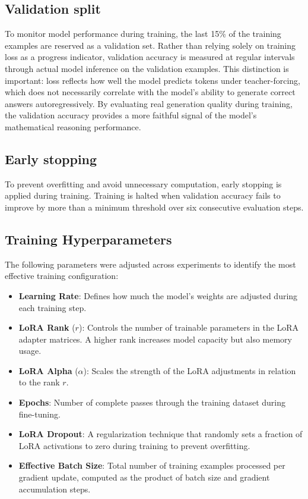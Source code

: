 \subsection*{Validation split}
To monitor model performance during training, the last 15\% of
  the training examples are reserved as a validation set.
  Rather than
  relying solely on training loss as a progress indicator,
  validation accuracy is measured at regular intervals through
  actual model inference on the validation examples. This
  distinction is important: loss reflects how well the model
  predicts tokens under teacher-forcing, which does not
  necessarily correlate with the model's ability to generate
  correct answers autoregressively. By evaluating real generation
  quality during training, the validation accuracy provides a more
  faithful signal of the model's mathematical reasoning
  performance.

\subsection*{Early stopping}
To prevent overfitting and avoid unnecessary computation, early
  stopping is applied during training. Training is halted when
  validation accuracy fails to improve by more than a minimum
  threshold over six consecutive evaluation steps.

\subsection*{Training Hyperparameters}
The following parameters were adjusted across experiments to
  identify the most effective training configuration:
\begin{itemize}
      \item \textbf{Learning Rate}: Defines how much the model's
      weights are adjusted during each training step.
      \item \textbf{LoRA Rank} ($r$): Controls the number of
      trainable parameters in the LoRA adapter matrices. A higher
      rank increases model capacity but also memory usage.
      \item \textbf{LoRA Alpha} ($\alpha$): Scales the strength
      of the LoRA adjustments in relation to the rank $r$.
      \item \textbf{Epochs}: Number of complete passes through
      the training dataset during fine-tuning.
      \item \textbf{LoRA Dropout}: A regularization technique
      that randomly sets a fraction of LoRA activations to zero
      during training to prevent overfitting.
      \item \textbf{Effective Batch Size}: Total number of
      training examples processed per gradient update, computed
      as the product of batch size and gradient accumulation steps.
  \end{itemize}

